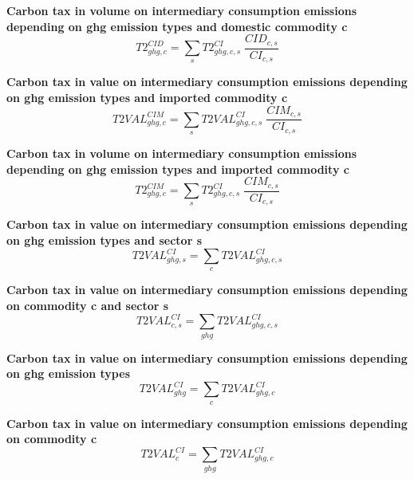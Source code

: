 \documentclass[12pt]{article}
\numberwithin{equation}{section}
\begin{document}
\noindent \textbf{Carbon tax in volume on intermediary consumption emissions depending on ghg emission types and domestic commodity c} 
\begin{dmath}
T2^{CID}_{ghg, c} = \sum_{s} T2^{CI}_{ghg, c, s} \; \frac{CID_{c, s}}{CI_{c, s}}
\label{Exception_taxes_prices.mdlT2_CID[ghg,c]}
\end{dmath}

\noindent \textbf{Carbon tax in value on intermediary consumption emissions depending on ghg emission types and imported commodity c} 
\begin{dmath}
T2VAL^{CIM}_{ghg, c} = \sum_{s} T2VAL^{CI}_{ghg, c, s} \; \frac{CIM_{c, s}}{CI_{c, s}}
\label{Exception_taxes_prices.mdlT2VAL_CIM[ghg,c]}
\end{dmath}

\noindent \textbf{Carbon tax in volume on intermediary consumption emissions depending on ghg emission types and imported commodity c} 
\begin{dmath}
T2^{CIM}_{ghg, c} = \sum_{s} T2^{CI}_{ghg, c, s} \; \frac{CIM_{c, s}}{CI_{c, s}}
\label{Exception_taxes_prices.mdlT2_CIM[ghg,c]}
\end{dmath}

\noindent \textbf{Carbon tax in value on intermediary consumption emissions depending on ghg emission types and sector s} 
\begin{dmath}
T2VAL^{CI}_{ghg, s} = \sum_{c} T2VAL^{CI}_{ghg, c, s}
\label{Exception_taxes_prices.mdlT2VAL_CI[ghg,s]}
\end{dmath}

\noindent \textbf{Carbon tax in value on intermediary consumption emissions depending on commodity c and sector s} 
\begin{dmath}
T2VAL^{CI}_{c, s} = \sum_{ghg} T2VAL^{CI}_{ghg, c, s}
\label{Exception_taxes_prices.mdlT2VAL_CI[c,s]}
\end{dmath}

\noindent \textbf{Carbon tax in value on intermediary consumption emissions depending on ghg emission types} 
\begin{dmath}
T2VAL^{CI}_{ghg} = \sum_{c} T2VAL^{CI}_{ghg, c}
\label{Exception_taxes_prices.mdlT2VAL_CI[ghg]}
\end{dmath}

\noindent \textbf{Carbon tax in value on intermediary consumption emissions depending on commodity c} 
\begin{dmath}
T2VAL^{CI}_{c} = \sum_{ghg} T2VAL^{CI}_{ghg, c}
\label{Exception_taxes_prices.mdlT2VAL_CI[c]}
\end{dmath}
\end{document}

